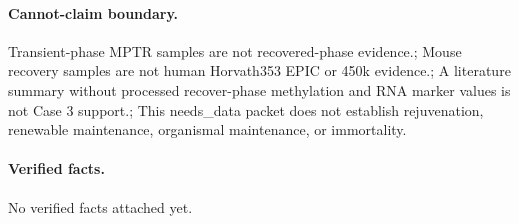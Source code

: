 \paragraph{Cannot-claim boundary.} Transient-phase MPTR samples are not recovered-phase evidence.; Mouse recovery samples are not human Horvath353 EPIC or 450k evidence.; A literature summary without processed recover-phase methylation and RNA marker values is not Case 3 support.; This needs\_data packet does not establish rejuvenation, renewable maintenance, organismal maintenance, or immortality.

\paragraph{Verified facts.}
No verified facts attached yet.
